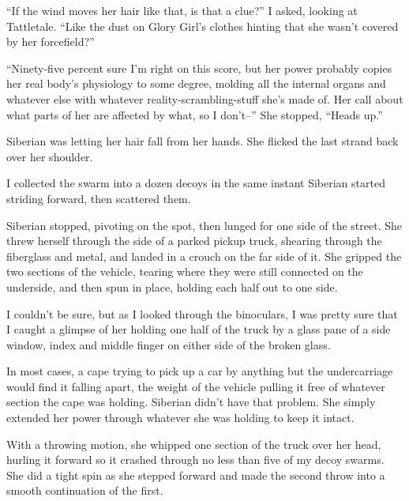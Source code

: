 ``If the wind moves her hair like that, is that a clue?'' I asked, looking at Tattletale.  ``Like the dust on Glory Girl's clothes hinting that she wasn't covered by her forcefield?''



``Ninety-five percent sure I'm right on this score, but her power probably copies her real body's physiology to some degree, molding all the internal organs and whatever else with whatever reality-scrambling-stuff she's made of.  Her call about what parts of her are affected by what, so I don't--''  She stopped, ``Heads up.''



Siberian was letting her hair fall from her hands.  She flicked the last strand back over her shoulder.



I collected the swarm into a dozen decoys in the same instant Siberian started striding forward, then scattered them.



Siberian stopped, pivoting on the spot, then lunged for one side of the street.  She threw herself through the side of a parked pickup truck, shearing through the fiberglass and metal, and landed in a crouch on the far side of it.  She gripped the two sections of the vehicle, tearing where they were still connected on the underside, and then spun in place, holding each half out to one side.



I couldn't be sure, but as I looked through the binoculars, I was pretty sure that I caught a glimpse of her holding one half of the truck by a glass pane of a side window, index and middle finger on either side of the broken glass.



In most cases, a cape trying to pick up a car by anything but the undercarriage would find it falling apart, the weight of the vehicle pulling it free of whatever section the cape was holding.  Siberian didn't have that problem.  She simply extended her power through whatever she was holding to keep it intact.



With a throwing motion, she whipped one section of the truck over her head, hurling it forward so it crashed through no less than five of my decoy swarms.  She did a tight spin as she stepped forward and made the second throw into a smooth continuation of the first.



